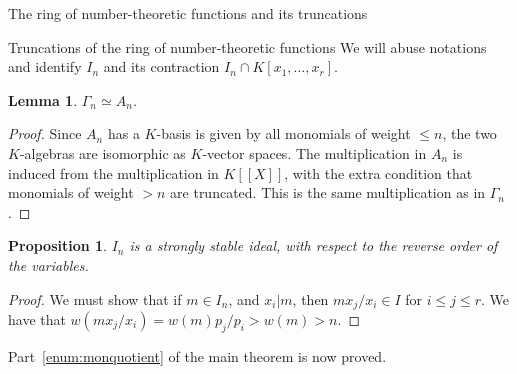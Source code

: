 \documentclass[reqno,10pt]{amsart}
\theoremstyle{definition}
\theoremstyle{remark}
\theoremstyle{plain}
\newtheorem{lemma}[definition]{Lemma}
\newtheorem{prop}[definition]{Proposition}
\newtheorem{proposition}[definition]{Proposition}
\newcommand{\M}{\mathcal{M}}
\newcommand{\divides}[2]{{#1 \left\lvert {#2} \right.}}
\begin{document}
\begin{section}{The ring of number-theoretic functions  and its
  truncations}
\begin{subsection}{Truncations of the ring of number-theoretic
  functions}
We will abuse notations and identify \(I_n\) and its contraction 
\(I_n \cap K[x_1,\dots,x_r]\).

\begin{lemma}\label{lemma:trunciso}
  \(\Gamma_n \simeq A_n\).
\end{lemma}
\begin{proof}
  Since \(A_n\) has a \(K\)-basis is given by all monomials of
  weight \(\le n\), the two \(K\)-algebras are isomorphic as
  \(K\)-vector spaces. The multiplication in \(A_n\) is induced from
  the multiplication in \(K[[X]]\), with the extra condition that
  monomials of weight \(>n\) are truncated. This is the same
  multiplication as in \(\Gamma_n\).
\end{proof}
  

  \begin{proposition}\label{prop:antistable}
    \(I_n\) is a strongly stable ideal, with respect to the reverse order of
    the variables.
  \end{proposition}
  \begin{proof}
    We must show that if \(m \in I_n\), and \(\divides{x_i}{m}\), then 
    \(m x_j/x_i \in I\) for \(i \le j \le r\).
    We have that \(w(m x_j/x_i) = w(m) p_j/p_i > w(m) > n\).
  \end{proof}
  Part~\ref{enum:monquotient} of the main theorem is now proved.
  
  

\end{subsection}
\end{section}
\end{document}
